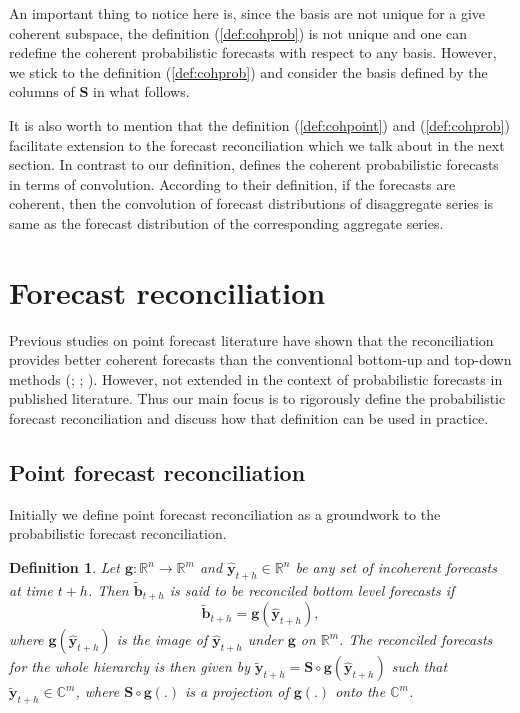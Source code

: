 \documentclass[a4paper, 11pt]{article}
\newtheorem{definition}{Definition}[section]
\begin{document}
	An important thing to notice here is, since the basis are not unique for a give coherent subspace, the definition (\ref{def:cohprob}) is not unique and one can redefine the coherent probabilistic forecasts with respect to any basis. However, we stick to the definition (\ref{def:cohprob}) and consider the basis defined by the columns of $\bm{S}$ in what follows.
	
	It is also worth to mention that the definition (\ref{def:cohpoint}) and (\ref{def:cohprob}) facilitate extension to the forecast reconciliation which we talk about in the next section. In contrast to our definition, \citet{BenTaieb2017} defines the coherent probabilistic forecasts in terms of convolution. According to their definition, if the forecasts are coherent, then the convolution of forecast distributions of disaggregate series is same as the forecast distribution of the corresponding aggregate series.  
	
	\section{Forecast reconciliation}\label{sec:reconciliation}
	
	Previous studies on point forecast literature have shown that the reconciliation provides better coherent forecasts than the conventional bottom-up and top-down methods (\cite{Hyndman2011}; \cite{VanErven2015a}; \cite{Wickramasuriya2017}). However, not extended in the context of probabilistic forecasts in published literature. Thus our main focus is to rigorously define the probabilistic forecast reconciliation and discuss how that definition can be used in practice.  
	
	\subsection{Point forecast reconciliation}
	
	Initially we define point forecast reconciliation as a groundwork to the probabilistic forecast reconciliation. 
	
	\begin{definition}\label{def:reconpoint}
		Let $\bm{g}:\bm{\mathbb{R}}^n \rightarrow \bm{\mathbb{R}}^m $ and $\hat{\bm{y}}_{t+h} \in \bm{\mathbb{R}}^n$ be any set of incoherent forecasts at time $t+h$. Then $\tilde{\bm{b}}_{t+h}$ is said to be reconciled bottom level forecasts if 
		\begin{equation}
		\tilde{\bm{b}}_{t+h}=\bm{g}(\hat{\bm{y}}_{t+h}),
		\end{equation}
		where $\bm{g}(\hat{\bm{y}}_{t+h})$ is the image of $\hat{\bm{y}}_{t+h}$ under $\bm{g}$ on $\bm{\mathbb{R}}^m$. The reconciled forecasts for the whole hierarchy is then given by $\tilde{\bm{y}}_{t+h}=\bm{S} \circ \bm{g}(\hat{\bm{y}}_{t+h})$ such that $\tilde{\bm{y}}_{t+h} \in \bm{\mathbb{C}}^m$, where $\bm{S}\circ \bm{g}(.)$ is a projection of $\bm{g}(.)$ onto the $\bm{\mathbb{C}}^m$.
	\end{definition}
	
\end{document}
